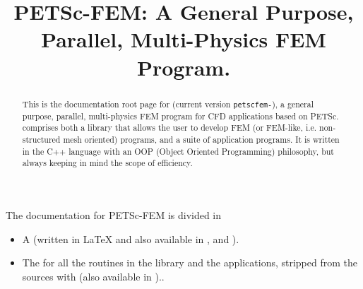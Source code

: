 \documentclass[11pt]{article}
\begin{document}
\sloppy

\title{PETSc-FEM: A General Purpose, Parallel, Multi-Physics FEM Program.}
\maketitle

\begin{abstract}
This is the documentation root page for \pfem (current version 
{\tt petscfem-\petscfemversion}), a general purpose, parallel,
multi-physics FEM program for CFD applications based on
PETSc. \pfem{} comprises both a library that allows the user to
develop FEM (or FEM-like, i.e. non-structured mesh oriented) programs, and
a suite of application programs. It is written in the C++ language
with an OOP (Object Oriented Programming) philosophy, but always
keeping in mind the scope of efficiency. 
\end{abstract}

The documentation for PETSc-FEM is divided in 

\begin{itemize}
\item A 
(written in \LaTeX{} and also available in
, and ).

\item The  for all the routines in the
library and the applications, stripped from the sources with
(also available in )..
\end{itemize}
\end{document}
